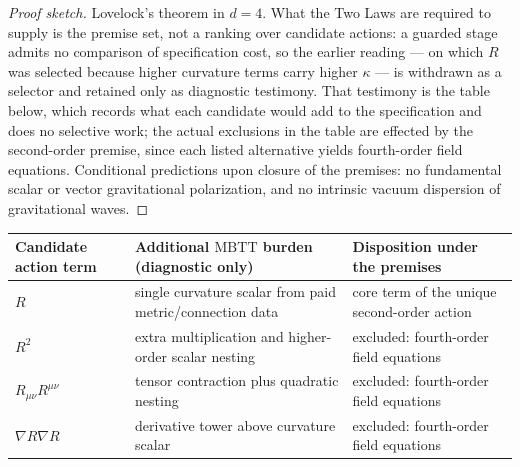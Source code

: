 \documentclass[11pt]{article}
\theoremstyle{plain}
\theoremstyle{definition}
\theoremstyle{remark}
\newenvironment{proofsketch}{\begin{proof}[Proof sketch]}{\end{proof}}
\newcommand{\MBTT}{\mathrm{MBTT}}
\begin{document}
\begin{proofsketch}
Lovelock's theorem in \(d=4\). What the Two Laws are required to supply is the premise set, not a ranking over candidate actions: a guarded stage admits no comparison of specification cost, so the earlier reading --- on which \(R\) was selected because higher curvature terms carry higher \(\kappa\) --- is withdrawn as a selector and retained only as diagnostic testimony. That testimony is the table below, which records what each candidate would add to the specification and does no selective work; the actual exclusions in the table are effected by the second-order premise, since each listed alternative yields fourth-order field equations. Conditional predictions upon closure of the premises: no fundamental scalar or vector gravitational polarization, and no intrinsic vacuum dispersion of gravitational waves.
\end{proofsketch}

\begin{center}
\small
\begin{tabularx}{\textwidth}{l Y Y}
\toprule
Candidate action term & Additional \(\MBTT\) burden (diagnostic only) & Disposition under the premises \\
\midrule
\(R\) & single curvature scalar from paid metric/connection data & core term of the unique second-order action \\
\(R^2\) & extra multiplication and higher-order scalar nesting & excluded: fourth-order field equations \\
\(R_{\mu\nu}R^{\mu\nu}\) & tensor contraction plus quadratic nesting & excluded: fourth-order field equations \\
\(\nabla R\nabla R\) & derivative tower above curvature scalar & excluded: fourth-order field equations \\
\bottomrule
\end{tabularx}
\end{center}
\end{document}

